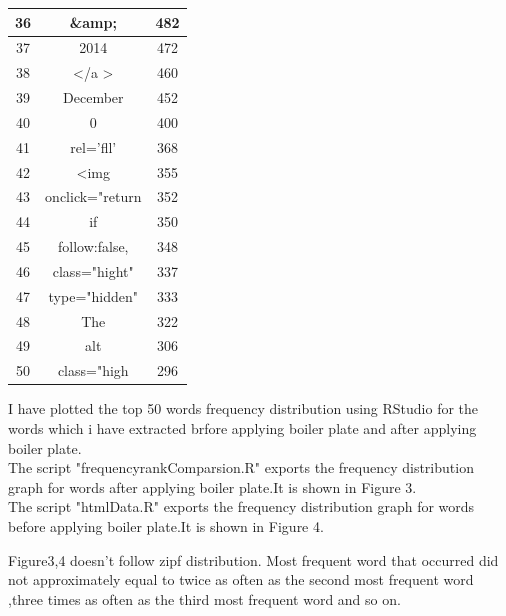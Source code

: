 \documentclass[12pt]{Report}
\begin{document}
\begin{table}
\begin{center}
\begin{tabular}{ c | c | c }
36 &\&amp; &482\\ \hline
37 &2014 &472\\ \hline
38 & \textless /a \textgreater &460\\ \hline
39 &December &452\\ \hline
40 &0 &400\\ \hline
41 &rel='fll' &368\\ \hline
42 &\textless img &355\\ \hline
43 &onclick="return &352\\ \hline
44 &if &350\\ \hline
45 & follow:false,&348\\ \hline
46 &class="hight" &337\\ \hline
47 &type="hidden" &333\\ \hline
48 &The &322\\ \hline
49 &alt &306\\ \hline
50&class="high &296\\ \hline
    \hline
  \end{tabular}
\end{center}
\label{table:htmlFiles}
\end{table}

I have plotted the top 50 words frequency distribution using RStudio for the words which i have extracted brfore applying boiler plate and after applying boiler plate.\\
The script "frequencyrankComparsion.R" exports the frequency distribution graph for words after applying boiler plate.It is shown in Figure 3. \\

 The script "htmlData.R" exports the frequency distribution graph for words before applying boiler plate.It is shown in Figure 4.
 
 Figure3,4 doesn't follow zipf distribution. Most frequent word  that occurred did not approximately equal to twice as often as the second most frequent word ,three times as often as the third most frequent word and so on.\\




\newpage
\end{document}
